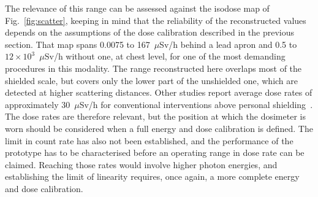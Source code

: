 The relevance of this range can be assessed against the isodose map of Fig.~\ref{fig:scatter}, keeping in mind that the reliability of the reconstructed values depends on the assumptions of the dose calibration described in the previous section. That map spans 0.0075 to 167~$\mu$Sv/h behind a lead apron and 0.5 to $12\times10^{3}$~$\mu$Sv/h without one, at chest level, for one of the most demanding procedures in this modality. The range reconstructed here overlaps most of the shielded scale, but covers only the lower part of the unshielded one, which are detected at higher scattering distances. Other studies report average dose rates of approximately 30~$\mu$Sv/h for conventional interventions above personal shielding~\cite{53}. The dose rates are therefore relevant, but the position at which the dosimeter is worn should be considered when a full energy and dose calibration is defined. The limit in count rate has also not been established, and the performance of the prototype has to be characterised before an operating range in dose rate can be claimed. Reaching those rates would involve higher photon energies, and establishing the limit of linearity requires, once again, a more complete energy and dose calibration.









